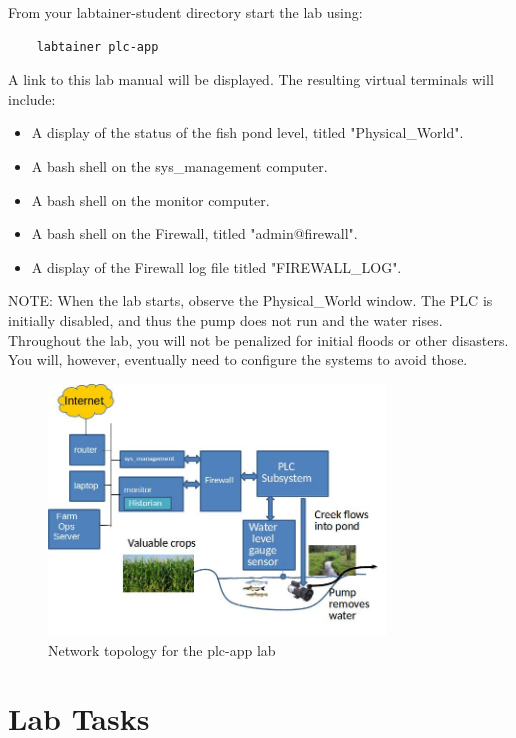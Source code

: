 From your labtainer-student directory start the lab using:
\begin{verbatim}
    labtainer plc-app
\end{verbatim}
\noindent A link to this lab manual will be displayed.  
The resulting virtual terminals will include:
\begin{itemize}
\item A display of the status of the fish pond level, titled "Physical\_World".
\item A bash shell on the sys\_management computer.
\item A bash shell on the monitor computer.
\item A bash shell on the Firewall, titled "admin@firewall".
\item A display of the Firewall log file titled "FIREWALL\_LOG".
\end{itemize}
\noindent NOTE: When the lab starts, observe the Physical\_World window. 
The PLC is initially disabled, and thus the pump does not run and the water rises.
Throughout the lab, you will not be penalized for initial floods or other disasters.
You will, however, eventually need to configure the systems to avoid those.

\begin{figure}[H]
\begin{center}
\includegraphics [width=0.8\textwidth]{plc-app.jpg}
\end{center}
\caption{Network topology for the plc-app lab}
\label{fig:topology}
\end{figure}

\section{Lab Tasks}
